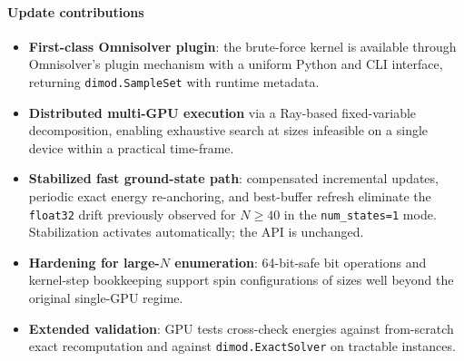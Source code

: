 \documentclass[preprint,12pt,a4paper]{elsarticle}
\begin{document}
\paragraph{Update contributions}
\begin{itemize}
    \item \textbf{First-class Omnisolver plugin}: the brute-force kernel is
    available through Omnisolver's plugin mechanism with a uniform Python and
    CLI interface, returning \texttt{dimod.SampleSet} with runtime metadata.
    \item \textbf{Distributed multi-GPU execution} via a Ray-based fixed-variable
    decomposition, enabling exhaustive search at sizes infeasible on a single
    device within a practical time-frame.
    \item \textbf{Stabilized fast ground-state path}: compensated incremental
    updates, periodic exact energy re-anchoring, and best-buffer refresh
    eliminate the \texttt{float32} drift previously observed for $N \geq 40$
    in the \texttt{num\_states=1} mode. Stabilization activates automatically;
    the API is unchanged.
    \item \textbf{Hardening for large-$N$ enumeration}: 64-bit-safe bit
    operations and kernel-step bookkeeping support spin configurations of
    sizes well beyond the original single-GPU regime.
    \item \textbf{Extended validation}: GPU tests cross-check energies against
    from-scratch exact recomputation and against \texttt{dimod.ExactSolver} on
    tractable instances.
\end{itemize}
\end{document}

